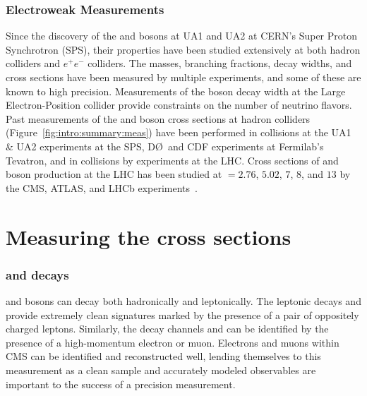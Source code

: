 \subsubsection{Electroweak Measurements}
Since the discovery of the \W and \Z bosons at UA1 and UA2 at CERN's Super Proton Synchrotron (SPS), their properties have been studied extensively at both hadron colliders and $e^+e^-$ colliders. The masses, branching fractions,  decay widths, and cross sections have been measured by multiple experiments, and some of these are known to high precision. Measurements of the \Z boson decay width at the Large Electron-Position collider provide constraints on the number of neutrino flavors. 
Past measurements of the \W and \Z boson cross sections at hadron colliders (Figure~\ref{fig:intro:summary:meas}) have been performed in \ppbar collisions at the UA1 \& UA2 experiments at the SPS, D\O ~and CDF experiments at Fermilab's Tevatron, and in \pp collisions by experiments at the LHC. 
Cross sections of \Wpm and \Z boson production at the LHC has been studied at \s $= 2.76$, $5.02$, $7$, $8$, and $13$ \TeV by the CMS, ATLAS, and LHCb experiments~\cite{Aad:2019bdc,Aaboud:2018nic,Aaboud:2016btc,CMS:2011aa,Aaij:2014wba,Aaij:2012mda,Aaij:2015gna,Aaij:2016qqz,Aaij:2016mgv,Aaij:2015zlq,Chatrchyan:2014mua,Aad:2016naf}. 



\section{Measuring the cross sections}
\subsubsection{\W and \Z decays}
\W and \Z bosons can decay both hadronically and leptonically. The leptonic decays \zee and \zmm provide extremely clean signatures marked by the presence of a pair of oppositely charged leptons. Similarly, the decay channels \wenu and \wmunu can be identified by the presence of a high-momentum electron or muon. Electrons and muons within CMS can be identified and reconstructed well, lending themselves to this measurement as a clean sample and accurately modeled observables are important to the success of a precision measurement.
